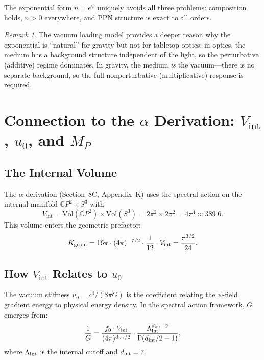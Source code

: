\documentclass[11pt]{article}
\newcommand{\CP}{\mathbb{C}P}
\newcommand{\Vint}{V_{\mathrm{int}}}
\theoremstyle{plain}
\theoremstyle{definition}
\theoremstyle{remark}
\newtheorem{remark}{Remark}
\begin{document}
The exponential form $n = e^\psi$ uniquely avoids all three problems:
composition holds, $n > 0$ everywhere, and PPN structure is exact to all
orders.

\begin{remark}
The vacuum loading model provides a deeper reason why the exponential
is ``natural'' for gravity but not for tabletop optics: in optics, the
medium has a background structure independent of the light, so the
perturbative (additive) regime dominates. In gravity, the medium \emph{is}
the vacuum---there is no separate background, so the full nonperturbative
(multiplicative) response is required.
\end{remark}


\section{Connection to the $\alpha$ Derivation: $\Vint$, $u_0$, and $M_P$}
\label{sec:alpha-connection}

\subsection{The Internal Volume}

The $\alpha$ derivation (Section~8C, Appendix~K) uses the spectral action
on the internal manifold $\CP^2 \times S^3$ with:
\begin{equation}
\Vint = \text{Vol}(\CP^2) \times \text{Vol}(S^3) = 2\pi^2 \times 2\pi^2 = 4\pi^4 \approx 389.6.
\label{eq:Vint}
\end{equation}
This volume enters the geometric prefactor:
\begin{equation}
K_{\rm geom} = 16\pi \cdot (4\pi)^{-7/2} \cdot \frac{1}{12} \cdot \Vint
= \frac{\pi^{3/2}}{24}.
\label{eq:Kgeom}
\end{equation}

\subsection{How $\Vint$ Relates to $u_0$}

The vacuum stiffness $u_0 = c^4/(8\pi G)$ is the coefficient
relating the $\psi$-field gradient energy to physical energy density.
In the spectral action framework, $G$ emerges from:
\begin{equation}
\frac{1}{G} = \frac{f_0 \cdot \Vint}{(4\pi)^{d_{\rm int}/2}}
\cdot \frac{\Lambda_{\rm int}^{d_{\rm int} - 2}}{\Gamma(d_{\rm int}/2 - 1)},
\end{equation}
where $\Lambda_{\rm int}$ is the internal cutoff and $d_{\rm int} = 7$.
\end{document}
